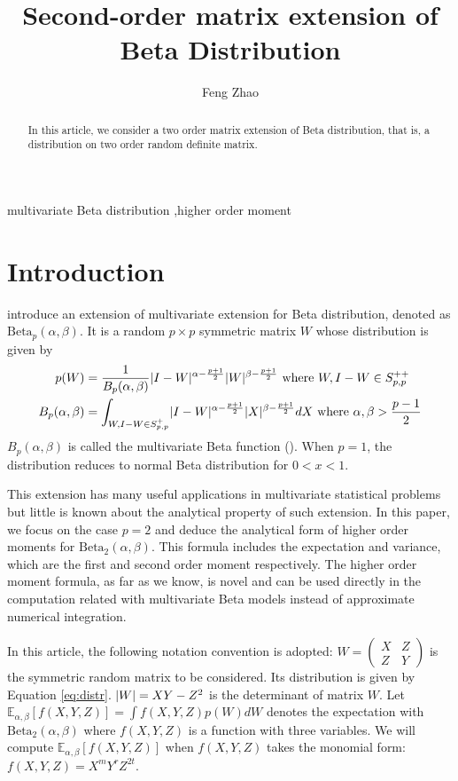 \documentclass{elsarticle}
\title{Second-order matrix extension of Beta Distribution}
\author{Feng Zhao}
\DeclarePairedDelimiter\abs{\lvert}{\rvert}
\def\E{\mathbb{E}}
\def\Beta{\textrm{Beta}}
\begin{document}
 \begin{abstract}
In this article, we consider a two order matrix extension of Beta distribution,
that is, a distribution on two order random definite matrix.
 \end{abstract}
\begin{keyword}
 multivariate Beta distribution \sep higher order moment
\end{keyword}
\maketitle
\section{Introduction}
\citet{olkin1964} introduce an extension of
multivariate extension for Beta distribution,
denoted as $\Beta_p(\alpha, \beta)$.
It is a random $p\times p$  symmetric matrix $W$ whose distribution
is given by
\begin{align}
p(W) &= \frac{1}{B_p(\alpha, \beta)}\abs{I-W}^{\alpha-\frac{p+1}{2}}
\abs{W}^{\beta-\frac{p+1}{2}} \textrm{ where } W, I-W \in S_{p,p}^{++}
\label{eq:distr}\\
B_p(\alpha, \beta) &= \int_{W,I-W \in S_{p,p}^{+} }\abs{I-W}^{\alpha-\frac{p+1}{2}}
\abs{X}^{\beta-\frac{p+1}{2}}dX \textrm{ where } \alpha, \beta > \frac{p-1}{2}
\end{align}
$B_p(\alpha, \beta)$ is called the multivariate Beta function (\citet{david1981}).
When $p=1$, the distribution reduces to normal Beta distribution for
$0<x<1$.

This extension has many useful applications in multivariate statistical
problems but little is known about the analytical property of such extension.
In this paper, we focus on the case $p=2$ and deduce the analytical form of 
higher order moments for $\Beta_2(\alpha, \beta)$. This formula
includes the expectation and variance, which are the first and second
order moment respectively. The higher order moment formula, as
far as we know, is novel and can be used directly in the computation
related with multivariate Beta models instead of approximate
numerical integration.

In this article, the following notation convention is adopted:
$W=\begin{pmatrix} X & Z \\ Z & Y \end{pmatrix}$ is the symmetric random
matrix to be considered. Its distribution is given by Equation \eqref{eq:distr}.
$\abs{W}=XY-Z^2$ is the determinant of matrix $W$.
Let $\E_{\alpha,\beta}[f(X,Y, Z)] = \int f(X,Y,Z)p(W)dW$ denotes the expectation
with $\Beta_2(\alpha, \beta)$ where $f(X, Y, Z)$ is a function with three
variables. We will compute $\E_{\alpha,\beta}[f(X,Y, Z)]$
when $f(X,Y,Z)$ takes the monomial form: $f(X,Y,Z)=X^m Y^r Z^{2t}$.
\end{document}
